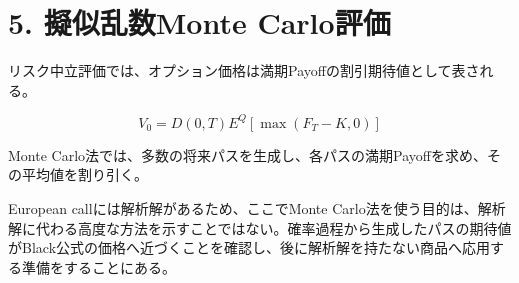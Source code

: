 \documentclass[
  letterpaper,
  DIV=11,
  numbers=noendperiod]{scrreprt}
\begin{document}
\section{5. 擬似乱数Monte
Carlo評価}\label{ux64ecux4f3cux4e71ux6570monte-carloux8a55ux4fa1}

リスク中立評価では、オプション価格は満期Payoffの割引期待値として表される。

\[
V_0
=
D(0,T)
E^Q
\left[
\max(F_T-K,0)
\right]
\]

Monte
Carlo法では、多数の将来パスを生成し、各パスの満期Payoffを求め、その平均値を割り引く。

European callには解析解があるため、ここでMonte
Carlo法を使う目的は、解析解に代わる高度な方法を示すことではない。確率過程から生成したパスの期待値がBlack公式の価格へ近づくことを確認し、後に解析解を持たない商品へ応用する準備をすることにある。
\end{document}
